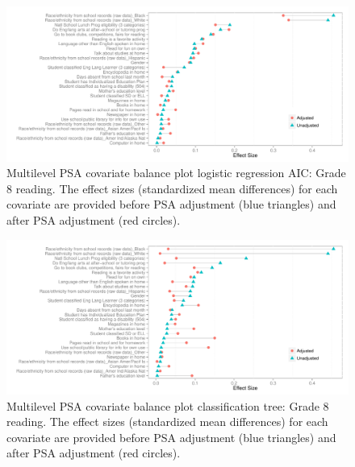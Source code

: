 \begin{figure}[h!]
\begin{center}
\includegraphics[width=\textwidth]{../Figures2009/g8read-mlpsa-lrAIC-balance.pdf}
\caption[Multilevel PSA covariate balance plot logistic regression AIC: Grade 8 reading]{Multilevel PSA covariate balance plot logistic regression AIC: Grade 8 reading. The effect sizes (standardized mean differences) for each covariate are provided before PSA adjustment (blue triangles) and after PSA adjustment (red circles).}
\end{center}
\end{figure}

\begin{figure}[h!]
\begin{center}
\includegraphics[width=\textwidth]{../Figures2009/g8read-mlpsa-ctree-balance.pdf}
\caption[Multilevel PSA covariate balance plot classification tree: Grade 8 reading]{Multilevel PSA covariate balance plot classification tree: Grade 8 reading. The effect sizes (standardized mean differences) for each covariate are provided before PSA adjustment (blue triangles) and after PSA adjustment (red circles).}
\end{center}
\end{figure}


\clearpage
{}
